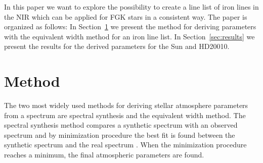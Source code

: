 \documentclass{aa}
\begin{document}
In this paper we want to explore the possibility to create a
line list of iron lines in the NIR which can be applied for FGK
stars in a consistent way. The paper is organized as follows:
In Section~\ref{sec:method} we present the method for deriving
parameters with the equivalent width method for an iron line list.
In Section~\ref{sec:results} we present the results for the derived
parameters for the Sun and HD20010.









\section{Method}
\label{sec:method}

The two most widely used methods for deriving stellar atmosphere
parameters from a spectrum are spectral synthesis and the equivalent
width method. The spectral synthesis method compares a synthetic
spectrum with an observed spectrum and by minimization procedure the
best fit is found between the synthetic spectrum and the real spectrum
\citep[see e.g.][]{Valenti2005,Onehag2012}. When the minimization
procedure reaches a minimum, the final atmospheric parameters are found.
\end{document}
